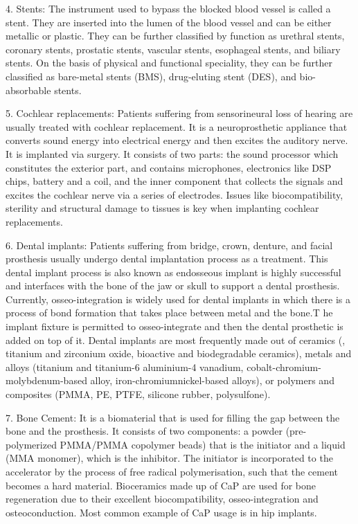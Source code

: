 \documentclass[11pt]{article}
\begin{document}
4. Stents: The instrument used to bypass the blocked blood vessel is called a stent. They are inserted into the lumen of the blood vessel and can be either metallic or plastic. They can be further classified by function as urethral stents, coronary stents, prostatic stents, vascular stents, esophageal stents, and biliary stents. On the basis of physical and functional speciality, they can be further classified as bare-metal stents (BMS), drug-eluting stent (DES), and bio-absorbable stents.

5. Cochlear replacements: Patients suffering from sensorineural loss of hearing are usually treated with cochlear replacement. It is a  neuroprosthetic appliance that converts sound energy into electrical energy and then excites the auditory nerve. It is implanted via surgery. It consists of two parts: the sound processor which constitutes the exterior part, and contains microphones, electronics like DSP chips, battery and a coil, and the inner component that collects the signals and excites the cochlear nerve via a series of electrodes. Issues like biocompatibility, sterility and structural damage to tissues is key when implanting cochlear replacements.

6. Dental implants: Patients suffering from  bridge, crown, denture, and facial prosthesis usually undergo dental implantation process as a treatment. This dental implant process is also known as endosseous implant is highly successful and interfaces with the bone of the jaw or skull to support a dental prosthesis. Currently, osseo-integration is widely used for dental implants in which there is a process of bond formation that takes place between metal and the bone.T he implant fixture is permitted to osseo-integrate and then the dental prosthetic is added on top of it. Dental implants are most frequently made out of ceramics (, titanium and zirconium oxide, bioactive and
biodegradable ceramics), metals and alloys (titanium and titanium-6 aluminium-4 vanadium, cobalt-chromium-molybdenum-based alloy, iron-chromiumnickel-based alloys), or polymers and composites (PMMA, PE, PTFE, silicone rubber, polysulfone).  

7. Bone Cement: It is a biomaterial that is used for filling the gap between the bone and the prosthesis. It consists of two components: a powder (pre-polymerized PMMA/PMMA copolymer beads) that is the initiator and a liquid (MMA monomer), which is the inhibitor. The initiator is incorporated to the accelerator by the process of free radical polymerisation, such that the cement becomes a hard material. Bioceramics made up of CaP are used for bone regeneration due to their excellent biocompatibility, osseo-integration and osteoconduction. Most common example of CaP usage is in hip implants.
\end{document}
